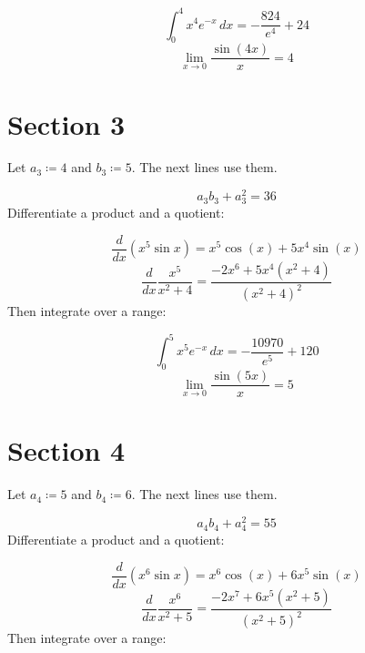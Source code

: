 \documentclass[11pt,a4paper]{article}
\theoremstyle{plain}
\theoremstyle{definition}
\theoremstyle{remark}
\begin{document}
\begin{equation*}
  \int_0^{4} x^{4} e^{-x} \, dx = -\frac{824}{e^{4}} + 24
\end{equation*}
\begin{equation*}
  \lim_{x \to 0} \frac{\sin(4 x)}{x} = 4
\end{equation*}
\section*{Section 3}

Let $a_{3} \coloneqq  4$ and $b_{3} \coloneqq  5$. The next lines use them.

\begin{equation*}
  a_{3} b_{3} + a_{3}^2 = 36
\end{equation*}
Differentiate a product and a quotient:

\begin{equation*}
  \frac{d}{dx} \left( x^{5} \sin x \right) = x^{5} \cos\left(x\right) + 5 x^{4} \sin\left(x\right)
\end{equation*}
\begin{equation*}
  \frac{d}{dx} \frac{x^{5}}{x^2 + 4} = \frac{-2 x^{6} + 5 x^{4} \left(x^{2} + 4\right)}{\left(x^{2} + 4\right)^{2}}
\end{equation*}
Then integrate over a range:

\begin{equation*}
  \int_0^{5} x^{5} e^{-x} \, dx = -\frac{10970}{e^{5}} + 120
\end{equation*}
\begin{equation*}
  \lim_{x \to 0} \frac{\sin(5 x)}{x} = 5
\end{equation*}
\section*{Section 4}

Let $a_{4} \coloneqq  5$ and $b_{4} \coloneqq  6$. The next lines use them.

\begin{equation*}
  a_{4} b_{4} + a_{4}^2 = 55
\end{equation*}
Differentiate a product and a quotient:

\begin{equation*}
  \frac{d}{dx} \left( x^{6} \sin x \right) = x^{6} \cos\left(x\right) + 6 x^{5} \sin\left(x\right)
\end{equation*}
\begin{equation*}
  \frac{d}{dx} \frac{x^{6}}{x^2 + 5} = \frac{-2 x^{7} + 6 x^{5} \left(x^{2} + 5\right)}{\left(x^{2} + 5\right)^{2}}
\end{equation*}
Then integrate over a range:
\end{document}
